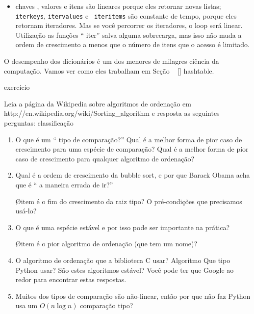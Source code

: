 \documentclass[10pt]{book}
\begin{document}
\begin{v erbatim}
\begin{itemize}
\item{chaves \tt}, {valores \tt} e {itens \tt} são lineares porque eles
  retornar novas listas; {\tt iterkeys}, {\tt itervalues} e {\tt
    iteritems} são constante de tempo, porque eles retornam iteradores. Mas
  se você percorrer os iteradores, o loop será linear. Utilização
  as funções `` iter'' salva alguma sobrecarga, mas isso não muda
  a ordem de crescimento a menos que o número de itens que o acesso é
  limitado.

\end{itemize}

O desempenho dos dicionários é um dos menores de milagres
ciência da computação. Vamos ver como eles trabalham em
Seção ~ \ref {} hashtable.


\begin{} exercício

Leia a página da Wikipedia sobre algoritmos de ordenação em
\url{} http://en.wikipedia.org/wiki/Sorting_algorithm e resposta
as seguintes perguntas:
\index{} classificação

\begin{enumerate}

\item O que é um `` tipo de comparação?'' Qual é a melhor forma de pior caso
  de crescimento para uma espécie de comparação? Qual é a melhor forma de pior caso
  de crescimento para qualquer algoritmo de ordenação?

\item Qual é a ordem de crescimento da bubble sort, e por que Barack
  Obama acha que é `` a maneira errada de ir?''

\O item é o fim do crescimento da raiz tipo? O pré-condições
  que precisamos usá-lo?

\item O que é uma espécie estável e por isso pode ser importante na prática?

\O item é o pior algoritmo de ordenação (que tem um nome)?

\item O algoritmo de ordenação que a biblioteca C usar? Algoritmo Que tipo
  Python usar? São estes algoritmos estável? Você pode ter que
  Google ao redor para encontrar estas respostas.

\item Muitos dos tipos de comparação são não-linear, então por que não faz
  Python usa um $ O (n \log n) $ comparação tipo?


\end{enumerate}
\end{}
\end{v erbatim}
\end{document}

